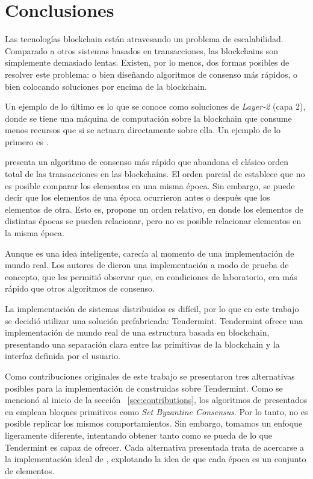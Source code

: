 %
\section{Conclusiones}
Las tecnologías blockchain están atravesando un problema de escalabilidad.
%
Comparado a otros sistemas basados en transacciones, las blockchains son simplemente
demasiado lentas.
%
Existen, por lo menos, dos formas posibles de resolver este problema: o bien
diseñando algoritmos de consenso más rápidos, o bien colocando soluciones por
encima de la blockchain.

%
Un ejemplo de lo último es lo que se conoce como soluciones de \emph{Layer-2}
(capa 2),
donde se tiene una máquina de computación sobre la blockchain que consume menos
recursos que si se actuara directamente sobre ella.
%
Un ejemplo de lo primero es \setchain.

\setchain presenta un algoritmo de consenso más rápido
que abandona el clásico orden total de las transacciones en las blockchains.
%
El orden parcial de \setchain establece que no es posible comparar los elementos
en una misma época.
%
Sin embargo, se puede decir que los elementos de una época ocurrieron antes o después
que los elementos de otra.
%
Esto es, \setchain propone un orden relativo, en donde los elementos
de distintas épocas se pueden relacionar, pero no es posible relacionar elementos
en la misma época.

Aunque \setchain es una idea inteligente, carecía al momento de una implementación
de mundo real.
%
Los autores de \setchain dieron una implementación a modo de prueba de concepto,
que les permitió observar que, en condiciones de laboratorio,
era más rápido que otros algoritmos de consenso.
%

La implementación de sistemas distribuidos es difícil, por lo que en este trabajo
se decidió utilizar una solución prefabricada: Tendermint.
Tendermint ofrece una implementación
de mundo real de una estructura basada en blockchain, presentando una separación clara
entre las primitivas de la blockchain y la interfaz definida por el usuario.


Como contribuciones originales de este trabajo se presentaron tres alternativas posibles para la implementación
de \setchain construidas sobre Tendermint. Como se mencionó al inicio de la sección ~\ref{sec:contributions},
los algoritmos de \setchain
presentados en \cite{Capretto.2022.Setchain} emplean bloques primitivos como
\emph{Set Byzantine Consensus}.
Por lo tanto, no es posible replicar los mismos comportamientos.
Sin embargo, tomamos un enfoque ligeramente diferente,
intentando obtener tanto como se pueda de lo que Tendermint es capaz de ofrecer.
Cada alternativa presentada trata de acercarse a la implementación ideal de \setchain,
explotando la idea de que cada época es un conjunto de elementos.

